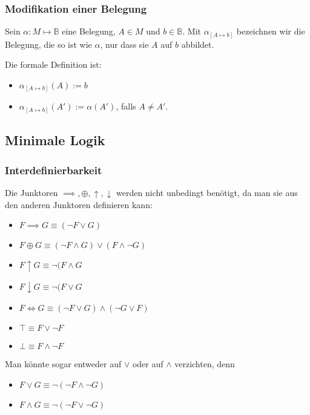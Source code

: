\documentclass{scrartcl}
\begin{document}
\pagebreak
\subsubsection{Modifikation einer Belegung}

Sein $\alpha : M \mapsto \mathbb{B}$ eine Belegung, $A \in M$ und $b \in \mathbb{B}$. Mit $\alpha_{[A \mapsto b]}$ bezeichnen wir die Belegung, die so ist wie $\alpha$, nur dass sie $A$ auf $b$ abbildet.

Die formale Definition ist:

\begin{itemize}
	\item $\alpha_{[A \mapsto b]}(A) := b$
	\item $\alpha_{[A \mapsto b]}(A') := \alpha(A')$, falls $A \neq A'$.
\end{itemize}

\subsection{Minimale Logik}

\subsubsection{Interdefinierbarkeit}

Die Junktoren $\implies, \oplus, \uparrow, \downarrow$ werden nicht unbedingt benötigt, da man sie aus den anderen Junktoren definieren kann:

\begin{itemize}
	\item $F \implies G \equiv (\neg F \vee G)$
	\item $F \oplus G \equiv (\neg F \wedge G) \vee (F \wedge \neg G)$
	\item $F \uparrow G \equiv \neg (F \wedge G$
	\item $F \downarrow G \equiv \neg (F \vee G$
	\item $F \iff G \equiv (\neg F \vee G) \wedge (\neg G \vee F)$
	\item $\top \equiv F \vee \neg F$
	\item $\bot \equiv F \wedge \neg F$
\end{itemize}

Man könnte sogar entweder auf $\vee$ oder auf $\wedge$ verzichten, denn

\begin{itemize}
	\item $F \vee G \equiv \neg (\neg F \wedge \neg G)$
	\item $F \wedge G \equiv \neg (\neg F \vee \neg G)$
\end{itemize}
\end{document}
